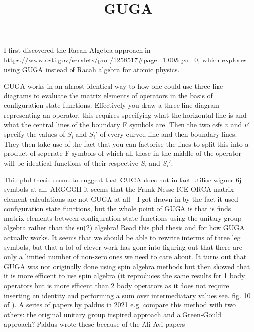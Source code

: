 \documentclass[aps,prx,twocolumn,floatfix,10pt,amssymb,amsfont,amsmath,superscriptaddress,float,nofootinbib,longbibliography,nobalancelastpage]{revtex4-2}
\begin{document}
\title{GUGA}
I first discovered the Racah Algebra approach in \url{https://www.osti.gov/servlets/purl/1258517#page=1.00&gsr=0}, which explores using GUGA instead of Racah algebra for atomic physics.

GUGA works in an almost identical way to how one could use three line diagrams to evaluate the matrix elements of operators in the basis of configuration state functions. Effectively you draw a three line diagram representing an operator, this requires specifying what the horizontal line is and what the central lines of the boundary F symbols are. Then the two csfs $v$ and $v'$ specify the values of $S_i$ and $S_i'$ of every curved line and then boundary lines. They then take use of the fact that you can factorise the lines to split this into a product of seperate F symbols of which all those in the middle of the operator will be identical functions of their respective $S_i$ and $S_i'$.

This phd thesis \cite{dobrautz2019development} seems to suggest that GUGA does not in fact utilise wigner 6j symbols at all. ARGGGH it seems that the Frank Nesse ICE-ORCA matrix element calculations are not GUGA at all - I got drawn in by the fact it used configuration state functions, but the whole point of GUGA is that is finds matrix elements between configuration state functions using the unitary group algebra rather than the su(2) algebra! Read this phd thesis and \cite{shavitt1978matrix} for how GUGA actually works. It seems that we should be able to rewrite interms of three leg symbols, but that a lot of clever work has gone into figuring out that there are only a limited number of non-zero ones we need to care about. It turns out that GUGA was not originally done using spin algebra methods but then \cite{paldus1980unitary} showed that it is more efficent to use spin algebra (it reproduces the same results for 1 body operators but is more efficent than 2 body operators as it does not require inserting an identity and performing a sum over intermediatary values see. fig. 10 of \cite{paldus2021matrix}). A series of papers by paldus in 2021 e.g. \cite{paldus2021matrix} compare this method with two others: the original unitary group inspired approach and a Green‑Gould
approach? Paldus wrote these because of the Ali Avi papers
\end{document}
